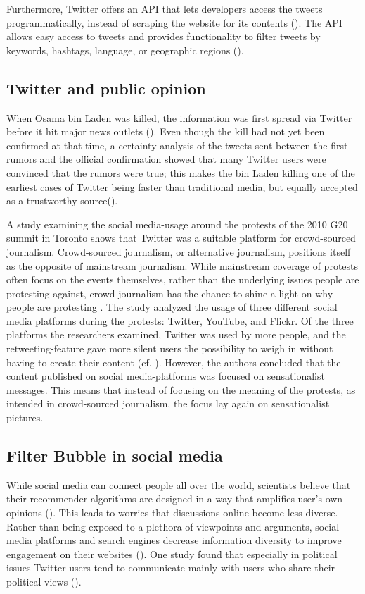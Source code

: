 Furthermore, Twitter offers an API that lets developers access the tweets programmatically, instead of scraping the website for its contents (\cite{twitter_inc_about_nodate}). The API allows easy access to tweets and provides functionality to filter tweets by keywords, hashtags, language, or geographic regions (\cite{bello2017detecting}).

\subsection{Twitter and public opinion}  %
When Osama bin Laden was killed, the information was first spread via Twitter before it hit major news outlets (\cite{hu2012breaking}). 
Even though the kill had not yet been confirmed at that time, a certainty analysis of the tweets sent between the first rumors and the official confirmation showed that many Twitter users were convinced that the rumors were true; this makes the bin Laden killing one of the earliest cases of Twitter being faster than traditional media, but equally accepted as a trustworthy source(\cite[2751]{hu2012breaking}).

A study examining the social media-usage around the protests of the 2010 G20 summit in Toronto shows that Twitter was a suitable platform for crowd-sourced journalism\cite{poell2012twitter}. Crowd-sourced journalism, or alternative journalism, positions itself as the opposite of mainstream journalism. While mainstream coverage of protests often focus on the events themselves, rather than the underlying issues people are protesting against, crowd journalism has the chance to shine a light on why people are protesting \cite[698]{poell2012twitter}. The study analyzed the usage of three different social media platforms during the protests: Twitter, YouTube, and Flickr. Of the three platforms the researchers examined, Twitter was used by more people, and the retweeting-feature gave more silent users the possibility to weigh in without having to create their  content (cf. \cite[709]{poell2012twitter}). However, the authors concluded that the content published on social media-platforms was focused on sensationalist messages. This means that instead of focusing on the meaning of the protests, as intended in crowd-sourced journalism, the focus lay again on sensationalist pictures.

\subsection{Filter Bubble in social media}
While social media can connect people all over the world, scientists believe that their recommender algorithms are designed in a way that amplifies user's own opinions (\cite{pariser2011filter}). This leads to worries that discussions online become less diverse. Rather than being exposed to a plethora of viewpoints and arguments, social media platforms and search engines decrease information diversity to improve engagement on their websites (\cite{bozdag_breaking_2015}). One study found that especially in political issues Twitter users tend to communicate mainly with users who share their political views (\cite{barbera_tweeting_2015}).

